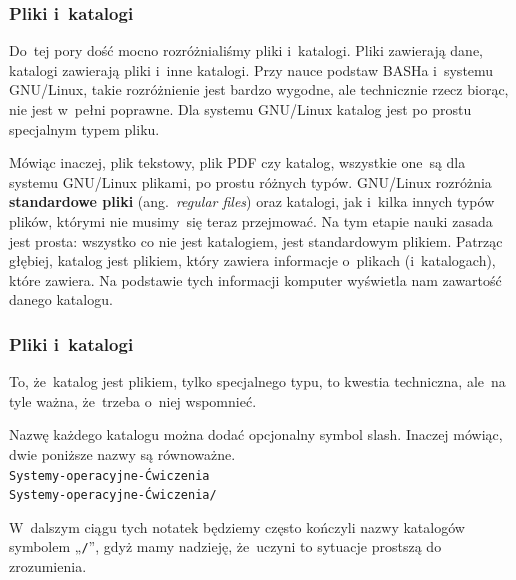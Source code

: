\documentclass[10pt,t]{beamer}
\begin{document}
\begin{frame}
  \frametitle{Pliki i~katalogi}


  Do~tej pory dość mocno rozróżnialiśmy pliki i~katalogi. Pliki zawierają
  dane, katalogi zawierają pliki i~inne katalogi. Przy nauce podstaw
  BASHa i~systemu GNU/Linux, takie rozróżnienie jest bardzo wygodne,
  ale technicznie rzecz biorąc, nie jest w~pełni poprawne. Dla systemu
  GNU/Linux katalog jest po prostu \alert{specjalnym typem pliku}.

  Mówiąc inaczej, plik tekstowy, plik PDF czy katalog, wszystkie one~są
  dla systemu GNU/Linux plikami, po prostu różnych typów. GNU/Linux
  rozróżnia \textbf{standardowe pliki} (ang.~\textit{regular files})
  oraz katalogi, jak i~kilka innych typów plików, którymi nie musimy~się
  teraz przejmować. Na tym etapie nauki zasada jest prosta: wszystko
  co nie jest katalogiem, jest standardowym plikiem. Patrząc głębiej,
  katalog jest plikiem, który zawiera informacje o~plikach (i~katalogach),
  które zawiera. Na podstawie tych informacji komputer wyświetla nam
  zawartość danego katalogu.

\end{frame}





\begin{frame}
  \frametitle{Pliki i~katalogi}


  To, że~katalog jest plikiem, tylko specjalnego typu, to kwestia
  techniczna, ale~na tyle ważna, że~trzeba o~niej wspomnieć.

  Nazwę każdego katalogu można dodać opcjonalny symbol slash. Inaczej
  mówiąc, dwie poniższe nazwy są równoważne. \\
  \texttt{Systemy-operacyjne-Ćwiczenia} \\
  \texttt{Systemy-operacyjne-Ćwiczenia/}

  W~dalszym ciągu tych notatek będziemy często kończyli nazwy katalogów
  symbolem „\texttt{/}”, gdyż mamy nadzieję, że~uczyni to sytuacje
  prostszą do zrozumienia.

\end{frame}










\end{document}
